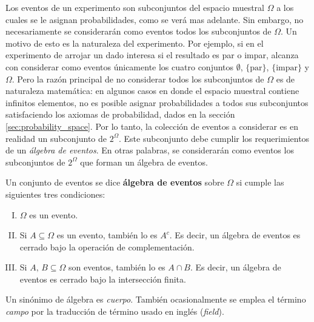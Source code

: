 \documentclass[a4paper]{report}
\begin{document}
Los eventos de un experimento son subconjuntos del espacio muestral \(\Omega\) a los cuales se le asignan probabilidades, como se verá mas adelante. Sin embargo, no necesariamente se considerarán como eventos todos los subconjuntos de \(\Omega\). Un motivo de esto es la naturaleza del experimento. Por ejemplo, si en el experimento de arrojar un dado interesa si el resultado es par o impar, alcanza con considerar como eventos únicamente los cuatro conjuntos \(\emptyset\), \(\{\textrm{par}\}\), \(\{\textrm{impar}\}\) y \(\Omega\). Pero la razón principal de no considerar todos los subconjuntos de \(\Omega\) es de naturaleza matemática: en algunos casos en donde el espacio muestral contiene infinitos elementos, no es posible asignar probabilidades a todos sus subconjuntos satisfaciendo los axiomas de probabilidad, dados en la sección \ref{sec:probability_space}. Por lo tanto, la colección de eventos a considerar es en realidad un subconjunto de \(2^{\Omega}\). Este subconjunto debe cumplir los requerimientos de un \emph{álgebra de eventos}. En otras palabras, se considerarán como eventos los subconjuntos de \(2^{\Omega}\) que forman un álgebra de eventos.

Un conjunto de eventos se dice \textbf{álgebra de eventos} sobre \(\Omega\) si cumple las siguientes tres condiciones:
\begin{enumerate}[(I)]
 \item \(\Omega\) es un evento.
 \item Si \(A\subseteq\Omega\) es un evento, también lo es \(A^c\). Es decir, un álgebra de eventos es cerrado bajo la operación de complementación.
 \item Si \(A,\,B\subseteq\Omega\) son eventos, también lo es \(A\cap B\). Es decir, un álgebra de eventos es cerrado bajo la intersección finita.
\end{enumerate}
Un sinónimo de álgebra es \emph{cuerpo}. También ocasionalmente se emplea el término \emph{campo} por la traducción de término usado en inglés (\emph{field}).
\end{document}
